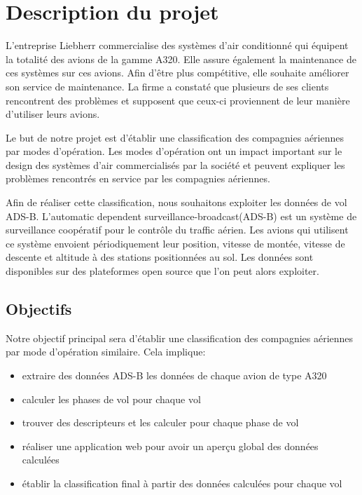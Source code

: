 \chapter*{Description du projet}
\label{chap:description}
L'entreprise Liebherr commercialise des systèmes d'air conditionné qui équipent
la totalité des avions de la gamme A320. Elle assure également la maintenance de ces systèmes sur ces avions. Afin d'être plus compétitive, elle souhaite améliorer son service de maintenance. La firme a constaté que plusieurs de ses clients rencontrent des problèmes et supposent que ceux-ci proviennent de leur manière d'utiliser leurs avions.

Le but de notre projet est d'établir une classification des compagnies aériennes par modes d'opération. Les modes d'opération ont un impact important sur le design des systèmes d'air commercialisés par la société et peuvent expliquer les problèmes rencontrés en service par les compagnies aériennes.

Afin de réaliser cette classification, nous souhaitons exploiter les données de vol ADS-B. L'automatic dependent surveillance-broadcast(ADS-B) est un système de surveillance coopératif pour le contrôle du traffic aérien. Les avions qui utilisent ce système envoient périodiquement leur position, vitesse de montée, vitesse de descente et altitude à des stations positionnées au sol. Les données sont disponibles sur des plateformes open source que l'on peut alors exploiter.

\section*{Objectifs}
Notre objectif principal sera d'établir une classification des compagnies aériennes par mode d'opération similaire. Cela implique:

\begin{itemize}
	\item extraire des données ADS-B les données de chaque avion de type A320
	\item calculer les phases de vol pour chaque vol
	\item trouver des descripteurs et les calculer pour chaque phase de vol
	\item réaliser une application web pour avoir un aperçu global des données calculées
	\item établir la classification final à partir des données calculées pour chaque vol
\end{itemize}


